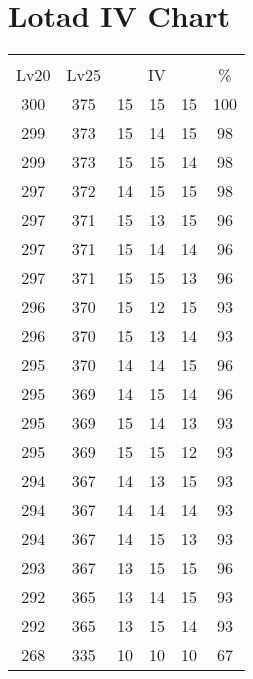 \documentclass{article}%
\begin{document}
%
\normalsize%
\section{Lotad IV Chart}%
\label{sec:Lotad IV Chart}%
\renewcommand{\arraystretch}{1.5}%
\begin{tabular}{|c|c|c|c|c|c|}%
\hline%
\multicolumn{6}{|c|}{\textcolor{white}{ 
\linebreak{Lotad}
}%
\cellcolor{black}}\\%
\multicolumn{1}{|c}{Lv20}&\multicolumn{1}{c|}{Lv25}&\multicolumn{3}{c|}{IV}&\multicolumn{1}{|c|}{\%}\\%
\hline%
\rowcolor{color100}%
300&375&15&15&15&100\\%
\hline%
\rowcolor{color98}%
299&373&15&14&15&98\\%
\hline%
\rowcolor{color98}%
299&373&15&15&14&98\\%
\hline%
\rowcolor{color98}%
297&372&14&15&15&98\\%
\hline%
\rowcolor{color96}%
297&371&15&13&15&96\\%
\hline%
\rowcolor{color96}%
297&371&15&14&14&96\\%
\hline%
\rowcolor{color96}%
297&371&15&15&13&96\\%
\hline%
\rowcolor{color93}%
296&370&15&12&15&93\\%
\hline%
\rowcolor{color93}%
296&370&15&13&14&93\\%
\hline%
\rowcolor{color96}%
295&370&14&14&15&96\\%
\hline%
\rowcolor{color96}%
295&369&14&15&14&96\\%
\hline%
\rowcolor{color93}%
295&369&15&14&13&93\\%
\hline%
\rowcolor{color93}%
295&369&15&15&12&93\\%
\hline%
\rowcolor{color93}%
294&367&14&13&15&93\\%
\hline%
\rowcolor{color93}%
294&367&14&14&14&93\\%
\hline%
\rowcolor{color93}%
294&367&14&15&13&93\\%
\hline%
\rowcolor{color96}%
293&367&13&15&15&96\\%
\hline%
\rowcolor{color93}%
292&365&13&14&15&93\\%
\hline%
\rowcolor{color93}%
292&365&13&15&14&93\\%
\hline%
\rowcolor{color91}%
268&335&10&10&10&67\\%
\end{tabular}

%
\end{document}
